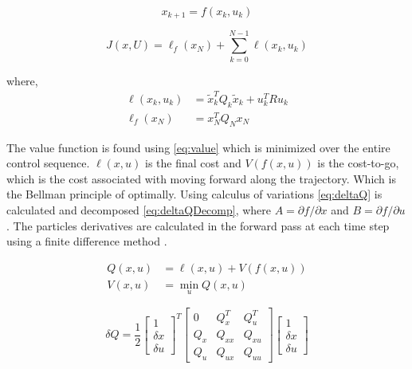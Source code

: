 \begin{equation}
     x_{k+1} = f(x_k,u_k) 
     \label{eq:system_dyn}
\end{equation}

\begin{equation}
    J(x,U) = \ell_f (x_N) + \sum_{k=0}^{N-1} \ell(x_k, u_k) 
    \label{eq:cost}
\end{equation}

where,
\begin{equation}
    \begin{split}
            \ell(x_k, u_k) &= \tilde{x}_k^T Q_k \tilde{x}_k + u_k^T R u_k \\
    \ell_f(x_N) &= x^{T}_{N} Q_N x_{N}
    \end{split}
      \label{eq:mycost}
\end{equation}

The value function is found using \autoref{eq:value} which is minimized over the entire control sequence. $\ell (x,u)$ is the final cost and $V(f(x,u))$ is the cost-to-go, which is the cost associated with moving forward along the trajectory. Which is the Bellman principle of optimally. Using calculus of variations \autoref{eq:deltaQ} is calculated and decomposed \autoref{eq:deltaQDecomp}, where $ A =\partial f / \partial x$ and  $B = \partial f / \partial u$.  The particles derivatives are calculated in the forward pass at each time step using a finite difference method \cite{iLQR_Zachary2016}. 


\begin{equation}
    \begin{split}
        Q(x,u) &= \ell (x,u) + V(f(x,u)) \\
        V(x,u) &= \min\limits_{u} Q(x,u)
    \end{split}
    \label{eq:value}
\end{equation}


\begin{equation}
     \delta Q = 
     \frac{1}{2}
     \begin{bmatrix}
     1 \\
     \delta x \\
     \delta u
     \end{bmatrix}^T
       \begin{bmatrix}
        0       & Q^T_{x} & Q^T_{u}  \\
        Q_{x}   & Q_{xx} & Q_{xu}  \\
        Q_{u}   & Q_{ux} & Q_{uu} 
    \end{bmatrix}
    \begin{bmatrix}
     1 \\
     \delta x \\
     \delta u
     \end{bmatrix}
        \label{eq:deltaQ}
\end{equation}

